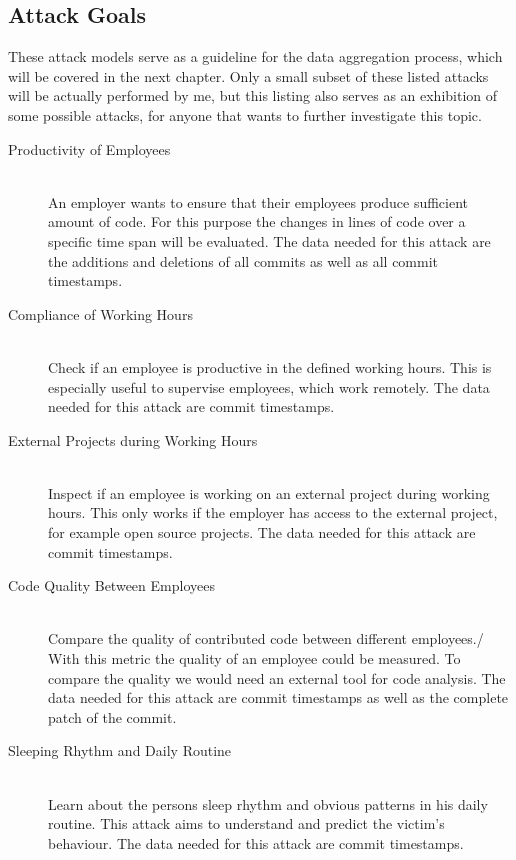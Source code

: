 \subsection{Attack Goals}\label{attack-goals}
These attack models serve as a guideline for the data aggregation process, which will be covered in the next chapter.
Only a small subset of these listed attacks will be actually performed by me, but this listing also serves as an exhibition of some possible attacks, for anyone that wants to further investigate this topic.

\begin{description}
    \item[Productivity of Employees] \hfill \\

        An employer wants to ensure that their employees produce sufficient amount of code.
        For this purpose the changes in lines of code over a specific time span will be evaluated.
        The data needed for this attack are the additions and deletions of all commits as well as all commit timestamps.

    \item[Compliance of Working Hours] \hfill \\
        Check if an employee is productive in the defined working hours.
        This is especially useful to supervise employees, which work remotely.
        The data needed for this attack are commit timestamps.

    \item[External Projects during Working Hours] \hfill \\
        Inspect if an employee is working on an external project during working hours.
        This only works if the employer has access to the external project, for example open source projects.
        The data needed for this attack are commit timestamps.

    \item[Code Quality Between Employees] \hfill \\
        Compare the quality of contributed code between different employees./
        With this metric the quality of an employee could be measured.
        To compare the quality we would need an external tool for code analysis.
        The data needed for this attack are commit timestamps as well as the complete patch of the commit.

    \item[Sleeping Rhythm and Daily Routine] \hfill \\
        Learn about the persons sleep rhythm and obvious patterns in his daily routine.
        This attack aims to understand and predict the victim's behaviour.
        The data needed for this attack are commit timestamps.


\end{description}
